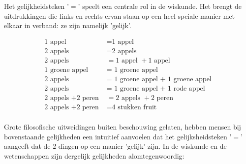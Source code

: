 \documentclass{ximera}
\begin{document}
	\author{Wiskunde Op Maat}

   
  Het gelijkheidsteken '\( = \)' speelt een centrale rol in de wiskunde.  Het brengt de uitdrukkingen die links en rechts ervan staan op een heel spciale manier met elkaar in verband: ze zijn namelijk 'gelijk'. 


\begin{align*}
    \text{1 appel }                        & =  \text{1 appel                      }\\
    \text{2 appels }                       & =  \text{2 appels                    }\\
    \text{2 appels }                       & =  \text{1 appel } + \text{1 appel }    \\
    \text{1 groene appel}                  & =  \text{ 1 groene  appel      }\\
    \text{2 appels }                       & =  \text{ 1 groene appel + 1 groene appel}\\
    \text{2 appels }                       & =  \text{ 1 groene appel + 1 rode appel  }\\
    \text{2 appels } + \text{2 peren }     & =  \text{2 appels } + \text{2 peren}\\
    \text{2 appels } + \text{2 peren }     & =  \text{4 stukken fruit }\\
\end{align*}

Grote filosofische uitweidingen buiten beschouwing gelaten, hebben mensen bij bovenstaande gelijkheden een intuitief aanvoelen dat het gelijksheidsteken 
'\( = \)' aangeeft dat de 2 dingen op een manier 'gelijk' zijn. In de wiskunde en de wetenschappen zijn dergelijk gelijkheden alomtegenwoordig: 
\end{document}
